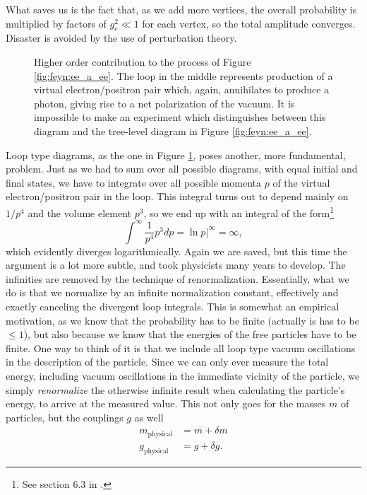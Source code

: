 What saves us is the fact that, as we add more vertices, the overall probability is multiplied by factors of $g_e^2 \ll 1$ for each vertex, so the total amplitude converges. Disaster is avoided by the use of perturbation theory.
\begin{figure}[htp]
\centering
	
\caption{Higher order contribution to the process of Figure \ref{fig:feyn:ee_a_ee}. The loop in the middle represents production of a virtual electron/positron pair which, again, annihilates to produce a photon, giving rise to a net polarization of the vacuum. It is impossible to make an experiment which distinguishes between this diagram and the tree-level diagram in Figure \ref{fig:feyn:ee_a_ee}.} \label{fig:feyn:ee_a_ee_2}
\end{figure}
Loop type diagrams, as the one in Figure \ref{fig:feyn:ee_a_ee_2}, poses another, more fundamental, problem. Just as we had to sum over all possible diagrams, with equal initial and final states, we have to integrate over all possible momenta $p$ of the virtual electron/positron pair in the loop. This integral turns out to depend mainly on $1 / p^4$ and the volume element $p^3$, so we end up with an integral of the form\footnote{See section 6.3 in \cite{griffiths1987iep}.}
\begin{equation}
	\int^\infty \frac{1}{p^4}p^3 dp = \ln{p}|^\infty = \infty,
\end{equation}
which evidently diverges logarithmically. Again we are saved, but this time the argument is a lot more subtle, and took physicists many years to develop. The infinities are removed by the technique of renormalization. Essentially, what we do is that we normalize by an infinite normalization constant, effectively and exactly canceling the divergent loop integrals. This is somewhat an empirical motivation, as we know that the probability has to be finite (actually is has to be $\leq 1$), but also because we know that the energies of the free particles have to be finite. One way to think of it is that we include all loop type vacuum oscillations in the description of the particle. Since we can only ever measure the total energy, including vacuum oscillations in the immediate vicinity of the particle, we simply \emph{renormalize} the otherwise infinite result when calculating the particle's energy, to arrive at the measured value. This not only goes for the masses $m$ of particles, but the couplings $g$ as well \cite{griffiths1987iep}
\begin{align}
	m_{\textrm{physical}} &= m + \delta m \nonumber \\
	g_{\textrm{physical}} &= g + \delta g.
\end{align}
